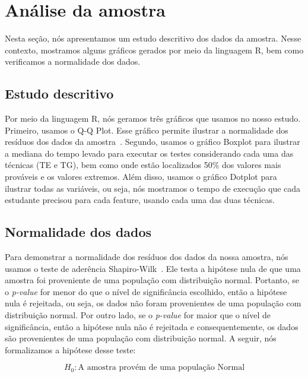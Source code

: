 \section{An\'alise da amostra}
\label{sec:analise}

Nesta seção, nós apresentamos um estudo descritivo dos dados da amostra. Nesse contexto, mostramos alguns gráficos gerados por meio da linguagem R, bem como verificamos a normalidade dos dados.

\subsection{Estudo descritivo}
\label{sec:estudo}

Por meio da linguagem R, nós geramos três gráficos que usamos no nosso estudo. Primeiro, usamos o Q-Q Plot. Esse gráfico permite ilustrar a normalidade dos resíduos dos dados da amostra~\cite{Wilk1968}. Segundo, usamos o gráfico Boxplot para ilustrar a mediana do tempo levado para executar os testes considerando cada uma das técnicas (TE e TG), bem como onde estão localizados 50\% dos valores mais prováveis e os valores extremos. Além disso, usamos o gráfico Dotplot para ilustrar todas as variáveis, ou seja, nós mostramos o tempo de execução que cada estudante precisou para cada feature, usando cada uma das duas técnicas.

\subsection{Normalidade dos dados}
\label{sec:normalidade}

Para demonstrar a normalidade dos resíduos dos dados da nossa amostra, nós usamos o teste de aderência Shapiro-Wilk~\cite{shapirowilk}. Ele testa a hipótese nula de que uma amostra foi proveniente de uma população com distribuição normal. Portanto, se o \emph{p-value} for menor do que o nível de significância escolhido, então a hipótese nula é rejeitada, ou seja, os dados não foram provenientes de uma população com distribuição normal. Por outro lado, se o \emph{p-value} for maior que o nível de significância, então a hipótese nula não é rejeitada e consequentemente, os dados são provenientes de uma população com distribuição normal. A seguir, nós formalizamos a hipótese desse teste:

\begin{equation}
	H_{0} : \text{A amostra provém de uma população Normal}
\end{equation}

